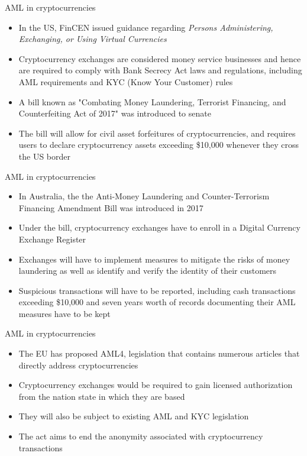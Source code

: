 \documentclass[11pt]{beamer}
\begin{document}
\begin{frame}{AML in cryptocurrencies}
	\begin{itemize}
		\item In the US, FinCEN issued guidance regarding \textit{Persons Administering, Exchanging, or Using Virtual Currencies}
		\item Cryptocurrency exchanges are considered money service businesses and hence are required to comply with Bank Secrecy Act laws and regulations, including AML requirements and KYC (Know Your Customer) rules
		\item A bill known as "Combating Money Laundering, Terrorist Financing, and Counterfeiting Act of 2017" was introduced to senate
		\item The bill will allow for civil asset forfeitures of cryptocurrencies, and requires users to declare cryptocurrency assets exceeding \$10,000 whenever they cross the US border
	\end{itemize}
\end{frame}


\begin{frame}{AML in cryptocurrencies}
	\begin{itemize}
		\item In Australia, the the Anti-Money Laundering and Counter-Terrorism Financing Amendment Bill was introduced in 2017
		\item Under the bill, cryptocurrency exchanges have to enroll in a Digital Currency Exchange Register
		\item Exchanges will have to implement measures to mitigate the risks of money laundering as well as identify and verify the identity of their customers
		\item Suspicious transactions will have to be reported, including cash transactions exceeding \$10,000 and seven years worth of records documenting their AML measures have to be kept
	\end{itemize}
\end{frame}


\begin{frame}{AML in cryptocurrencies}
	\begin{itemize}
		\item The EU has proposed AML4, legislation that contains numerous articles that directly address cryptocurrencies
		\item Cryptocurrency exchanges would be required to gain licensed authorization from the nation state in which they are based
		\item They will also be subject to existing AML and KYC legislation
		\item The act aims to end the anonymity associated with cryptocurrency transactions
	\end{itemize}
\end{frame}
\end{document}
